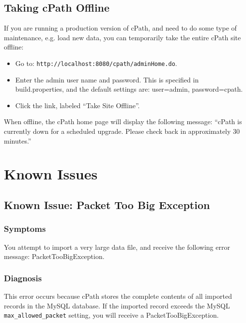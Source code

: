 \documentclass[letterpaper,12pt]{article}
\begin{document}
\subsection{Taking cPath Offline}

If you are running a production version of cPath, and need to do some type of maintenance, e.g. load new data, you can temporarily take the entire cPath site offline:

\begin{itemize}

\item Go to:  \verb+http://localhost:8080/cpath/adminHome.do+.

\item Enter the admin user name and password.  This is specified in build.properties, and the default settings are:  user=admin, password=cpath.

\item Click the link, labeled ``Take Site Offline''.
\end{itemize}

When offline, the cPath home page will display the following message: ``cPath is currently down for a scheduled upgrade. Please check back in approximately 30 minutes.''

\section{Known Issues}

\subsection{Known Issue: Packet Too Big Exception}

\subsubsection{Symptoms}  

You attempt to import a very large data file, and receive the following error message: PacketTooBigException.

\subsubsection{Diagnosis} 
This error occurs because cPath stores the complete contents of all imported records in the MySQL database.  If the imported record exceeds the MySQL \verb+max_allowed_packet+ setting, you will receive a PacketTooBigException.
\end{document}
